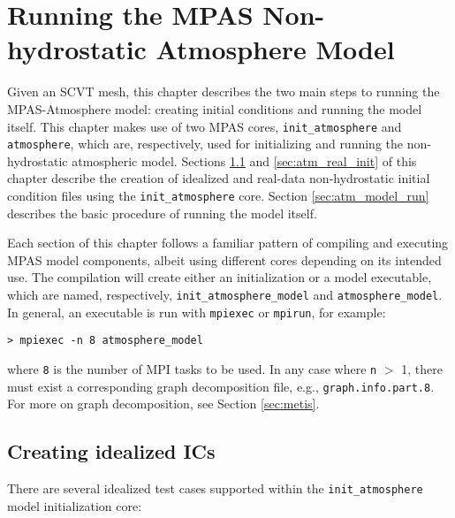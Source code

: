 
\chapter{Running the MPAS Non-hydrostatic Atmosphere Model}
\label{chap:running_mpas_a}

\setlength\LTleft{0.0in}

Given an SCVT mesh, this chapter describes the two main steps to running the MPAS-Atmosphere model: creating initial conditions and running the model itself.  This chapter makes use of two MPAS cores, {\tt init\_atmosphere} and {\tt atmosphere}, which are, respectively, used for initializing and running the non-hydrostatic atmospheric model.  Sections \ref{sec:atm_ideal_init} and \ref{sec:atm_real_init} of this chapter describe the creation of idealized and real-data non-hydrostatic initial condition files using the {\tt init\_atmosphere} core. Section \ref{sec:atm_model_run} describes the basic procedure of running the model itself.

Each section of this chapter follows a familiar pattern of compiling and executing MPAS model components, albeit using different cores depending on its intended use.  The compilation will create either an initialization or a model executable, which are named, respectively, {\tt init\_atmosphere\_model} and {\tt atmosphere\_model}.  In general, an executable is run with {\tt mpiexec} or {\tt mpirun}, for example:

\vspace{12pt}
{\tt > mpiexec -n 8 atmosphere\_model}
\vspace{12pt}


\noindent where {\tt 8} is the number of MPI tasks to be used.  In any case where {\tt n} $>$ 1, there must exist a corresponding graph decomposition file, e.g., {\tt graph.info.part.8}. For more on graph decomposition, see Section \ref{sec:metis}.  

\section{Creating idealized ICs}
\label{sec:atm_ideal_init}

There are several idealized test cases supported within the {\tt init\_atmosphere} model initialization core:

